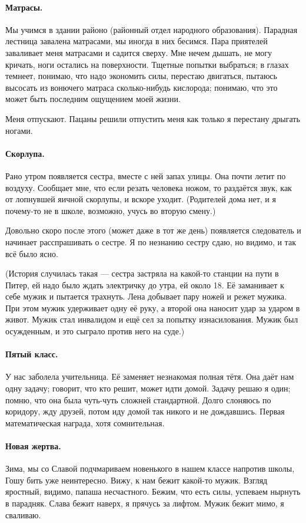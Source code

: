 \documentclass{book}
\begin{document}
\paragraph{Матрасы.}
Мы учимся в здании районо (районный отдел народного образования).
Парадная лестница завалена матрасами,
мы иногда в них бесимся.
Пара приятелей заваливает меня матрасами и садится сверху.
Мне нечем дышать, не могу кричать, ноги остались на поверхности.
Тщетные попытки выбраться;
в глазах темнеет, понимаю, что надо экономить силы, перестаю двигаться, пытаюсь высосать из вонючего матраса сколько-нибудь кислорода; 
понимаю, что это может быть последним ощущением моей жизни.

Меня отпускают.
Пацаны решили отпустить меня как только я перестану дрыгать ногами.

\paragraph{Скорлупа.}
Рано утром появляется сестра, вместе с ней запах улицы.
Она почти летит по воздуху.
Сообщает мне, что если резать человека ножом, то раздаётся звук, как от лопнувшей яичной скорлупы, и
вскоре уходит.
(Родителей дома нет, и я почему-то не в школе, возможно, учусь во вторую смену.)

Довольно скоро после этого (может даже в тот же день) появляется следователь и начинает расспрашивать о сестре. 
Я по незнанию сестру сдаю, но видимо, и так всё было ясно.

(История случилась такая --- сестра застряла на какой-то станции на пути в Питер, ей надо было ждать электричку до утра, ей около 18.
Её заманивает к себе мужик и пытается трахнуть.
Лена добывает пару ножей и режет мужика.
При этом мужик удерживает одну её руку, а второй она наносит удар за ударом в живот.
Мужик стал инвалидом и ещё сел за попытку изнасилования.
Мужик был осужденным, и это сыграло против него на суде.)

\paragraph{Пятый класс.}
У нас заболела учительница.
Её заменяет незнакомая полная тётя.
Она даёт нам одну задачу; говорит, что кто решит, может идти домой.
Задачу решаю я один; помню, что она была чуть-чуть сложней стандартной.
Долго слоняюсь по коридору, жду друзей, 
потом иду домой так никого и не дождавшись.
Первая математическая награда, хотя сомнительная.

\paragraph{Новая жертва.}
Зима, мы со Славой подчмариваем новенького в нашем классе напротив школы,
Гошу бить уже неинтересно.
Вижу, к нам бежит какой-то мужик. 
Взгляд яростный, видимо, папаша несчастного.
Бежим, что есть силы, успеваем нырнуть в парадняк.
Слава бежит наверх, я прячусь за лифтом.
Мужик бежит мимо, я сваливаю.
\end{document}
